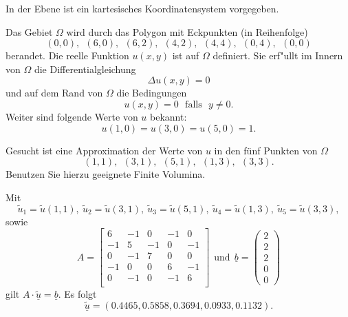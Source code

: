 In der Ebene ist ein kartesisches Koordinatensystem vorgegeben.

Das Gebiet $\Omega$ wird durch das Polygon mit Eckpunkten (in Reihenfolge)
\[
(0,0), \ \ (6,0), \ \ (6,2), \ \ (4,2),  \ \ (4,4),  \ \ (0,4), \ \  (0,0)
\]
berandet. Die reelle Funktion $u(x,y)$ ist auf $\Omega$ definiert.
Sie erf"ullt im Innern von $\Omega$ die Differentialgleichung
\[
\Delta u(x,y) = 0
\]
und auf dem Rand von $\Omega$ die Bedingungen
\[
u(x,y) = 0 \ \ \ \mbox{falls} \ \ \ y \neq 0.
\]
Weiter sind folgende Werte von $u$ bekannt:
\[
u(1,0) = u(3,0) = u(5,0) = 1.
\]

\vspace{1mm}

Gesucht ist eine Approximation der Werte von $u$ in den f\"unf Punkten
von $\Omega$
\[
(1,1), \ \  (3,1), \ \ (5,1), \ \  (1,3), \ \ (3,3).
\]
Benutzen Sie hierzu geeignete Finite Volumina.


\begin{loesung}
Mit
\[
\tilde u_1 = \tilde u(1,1), \ \tilde u_2 = \tilde u(3,1), \ \tilde u_3 = \tilde u(5,1), \ \tilde u_4 = \tilde u(1,3), \ \tilde u_5 = \tilde u(3,3),
\]
sowie
\[
A = \left[\begin{array}{rrrrr} 
6 & -1 & 0 & -1 & 0 \\
-1 & 5 & -1 & 0 & -1 \\
0 & -1 & 7 & 0 & 0 \\ 
-1 & 0 & 0 & 6 & -1 \\
0 & -1 & 0 & -1 & 6 \\
 \end{array}\right] \ \ \mbox{und} \ \
\underline{b} =  \left(\begin{array}{r} 2 \\ 2 \\ 2 \\ 0 \\ 0 \end{array}\right)
\]
gilt $A \cdot \underline{\tilde u} = \underline{b}.$
Es folgt
\[
\underline{\tilde u} = (0.4465, 0.5858, 0.3694, 0.0933, 0.1132).
\]
\end{loesung}
